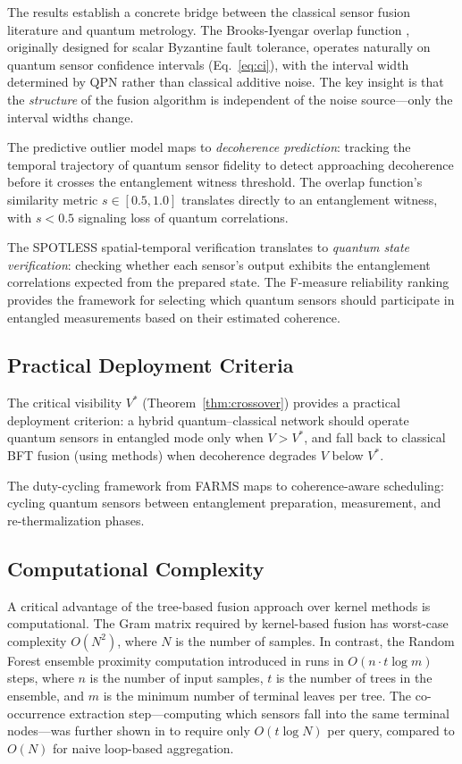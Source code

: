 \documentclass[twocolumn,11pt]{article}
\begin{document}
The results establish a concrete bridge between the classical
sensor fusion literature and quantum metrology.
The Brooks-Iyengar overlap function \cite{brooks1996robust},
originally designed for scalar Byzantine fault tolerance,
operates naturally on quantum sensor confidence intervals
(Eq.~\ref{eq:ci}), with the interval width determined by
QPN rather than classical additive noise.
The key insight is that the \textit{structure} of the fusion
algorithm is independent of the noise source---only the
interval widths change.

The predictive outlier model \cite{iyer2015virtual} maps to
\textit{decoherence prediction}: tracking the temporal
trajectory of quantum sensor fidelity to detect approaching
decoherence before it crosses the entanglement witness
threshold. The overlap function's similarity metric
$s \in [0.5, 1.0]$ translates directly to an entanglement
witness, with $s < 0.5$ signaling loss of quantum correlations.

The SPOTLESS spatial-temporal verification \cite{iyer2013spotless}
translates to \textit{quantum state verification}: checking
whether each sensor's output exhibits the entanglement
correlations expected from the prepared state.
The F-measure reliability ranking \cite{iyer2011fmeasure}
provides the framework for selecting which quantum sensors
should participate in entangled measurements based on their
estimated coherence.

\subsection{Practical Deployment Criteria}

The critical visibility $V^*$ (Theorem~\ref{thm:crossover})
provides a practical deployment criterion: a hybrid
quantum--classical network should operate quantum sensors
in entangled mode only when $V > V^*$, and fall back to
classical BFT fusion (using \cite{iyer2015virtual} methods)
when decoherence degrades $V$ below $V^*$.

The duty-cycling framework from FARMS
\cite{iyer2009farms} maps to coherence-aware scheduling:
cycling quantum sensors between entanglement preparation,
measurement, and re-thermalization phases.

\subsection{Computational Complexity}

A critical advantage of the tree-based fusion approach over
kernel methods is computational.
The Gram matrix required by kernel-based fusion has worst-case
complexity $O(N^2)$, where $N$ is the number of samples.
In contrast, the Random Forest ensemble proximity computation
introduced in \cite{iyer2015ai} runs in $O(n \cdot t \log m)$
steps, where $n$ is the number of input samples, $t$ is the
number of trees in the ensemble, and $m$ is the minimum number
of terminal leaves per tree.
The co-occurrence extraction step---computing which sensors
fall into the same terminal nodes---was further shown in
\cite{iyer2019fast} to require only $O(t \log N)$ per query,
compared to $O(N)$ for naive loop-based aggregation.
\end{document}
